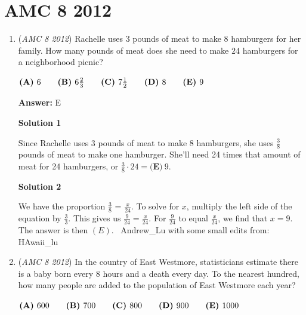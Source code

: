 \section{AMC 8 2012}
        \begin{enumerate}
        	\item (\textit{AMC 8 2012}) Rachelle uses $3$ pounds of meat to make $8$ hamburgers for her family. How many pounds of meat does she need to make $24$ hamburgers for a neighborhood picnic?


 $\textbf{(A)}\hspace{.05in}6\qquad\textbf{(B)}\hspace{.05in}6\frac{2}3\qquad\textbf{(C)}\hspace{.05in}7\frac{1}2\qquad\textbf{(D)}\hspace{.05in}8\qquad\textbf{(E)}\hspace{.05in}9$

 \textbf{Answer: }E



\textbf{Solution 1}

Since Rachelle uses $3$ pounds of meat to make $8$ hamburgers, she uses $\frac{3}{8}$ pounds of meat to make one hamburger. She'll need 24 times that amount of meat for 24 hamburgers, or $\frac{3}{8} \cdot 24 = \boxed{\textbf{(E)}\ 9}$.

 



\textbf{Solution 2}

We have the proportion $\frac{3}{8}$ = $\frac{x}{24}$. To solve for $x$, multiply the left side of the equation by $\frac{3}{3}$. This gives us $\frac{9}{24}=\frac{x}{24}$. For $\frac{9}{24}$ to equal $\frac{x}{24}$, we find that $x=9$. The answer is then $\boxed{(E)}$. ~Andrew\_Lu with some small edits from: HAwaii\_lu

 


	\item (\textit{AMC 8 2012}) In the country of East Westmore, statisticians estimate there is a baby born every $8$ hours and a death every day. To the nearest hundred, how many people are added to the population of East Westmore each year?


 $\textbf{(A)}\hspace{.05in}600\qquad\textbf{(B)}\hspace{.05in}700\qquad\textbf{(C)}\hspace{.05in}800\qquad\textbf{(D)}\hspace{.05in}900\qquad\textbf{(E)}\hspace{.05in}1000$


\end{enumerate}
